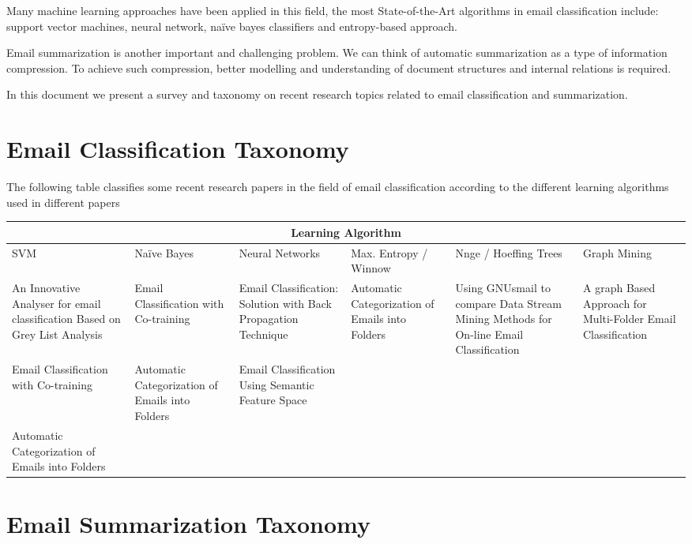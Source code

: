 \documentclass[12pt]{article}
\begin{document}
Many machine learning approaches have been applied in this field, the most 
State-of-the-Art algorithms in email classification include: support vector 
machines, neural network, naïve bayes classifiers and entropy-based approach. 

Email summarization is another important and challenging problem. We can think 
of automatic summarization as a type of information compression. To achieve such 
compression, better modelling and understanding of document structures and internal 
relations is required. 

In this document we present a survey and taxonomy on recent research topics 
related to email classification and summarization.

\section{Email Classification Taxonomy}
The following table classifies some recent research papers in the field of email 
classification according to the different learning algorithms used in different papers


\begin{tabular}{|p{2cm}|p{2cm}|p{2cm}|p{2cm}|p{2cm}|p{2cm}|}
\hline
\multicolumn{6}{|c|}{Learning Algorithm} \\
\hline
SVM & Naïve Bayes & Neural Networks & Max. Entropy / Winnow & Nnge / Hoeffing Trees & Graph Mining \\ \hline
An Innovative Analyser for email classification Based on Grey List Analysis &
Email Classification with Co-training &
Email Classification: Solution with Back Propagation Technique & 
Automatic Categorization of Emails into Folders &
Using GNUsmail to compare Data Stream Mining Methods for On-line Email Classification &
A graph Based Approach for Multi-Folder Email Classification \\ \hline

Email Classification with Co-training &
Automatic Categorization of Emails into Folders &
Email Classification Using Semantic Feature Space & 
&
&
 \\ \hline

Automatic Categorization of Emails into Folders &
&
& 
&
&

 \\
\hline
\end{tabular}

\section{Email Summarization Taxonomy}
\end{document}
